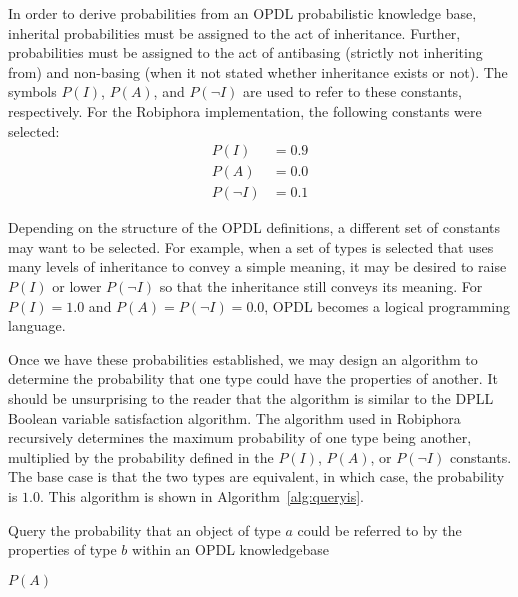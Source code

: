 \documentclass[12pt]{article}
\begin{document}
In order to derive probabilities from an OPDL probabilistic knowledge base,
inherital probabilities must be assigned to the act of inheritance. Further,
probabilities must be assigned to the act of antibasing (strictly not
inheriting from) and non-basing (when it not stated whether inheritance exists
or not). The symbols $P(I)$,  $P(A)$, and $P(\lnot I)$ are used to refer to
these constants, respectively. For the Robiphora implementation, the following
constants were selected:
\begin{align*}
    P(I) &= 0.9 \\
    P(A) &= 0.0 \\
    P(\lnot I) &= 0.1
\end{align*}

Depending on the structure of the OPDL definitions, a different set of
constants may want to be selected. For example, when a set of types is selected
that uses many levels of inheritance to convey a simple meaning, it may be
desired to raise $P(I)$ or lower $P(\lnot I)$ so that the inheritance still
conveys its meaning. For $P(I) = 1.0$ and $P(A) = P(\lnot I) = 0.0$, OPDL
becomes a logical programming language.

Once we have these probabilities established, we may design an algorithm to
determine the probability that one type could have the properties of another.
It should be unsurprising to the reader that the algorithm is similar to the
DPLL Boolean variable satisfaction algorithm\cite{dpll}. The algorithm used in
Robiphora recursively determines the maximum probability of one type being
another, multiplied by the probability defined in the $P(I)$, $P(A)$, or
$P(\lnot I)$ constants. The base case is that the two types are equivalent, in
which case, the probability is $1.0$. This algorithm is shown in
Algorithm~\ref{alg:queryis}.

\begin{algorithm}
    \caption{Query the probability that an object of type $a$ could be referred
    to by the properties of type $b$ within an OPDL knowledgebase}
    \label{alg:queryis}

    \begin{algorithmic}
                \State {}
            \EndIf
                \State \Return $P(A)$
            \EndIf
            \State {}
        \EndProcedure
    \end{algorithmic}
\end{algorithm}
\end{document}
